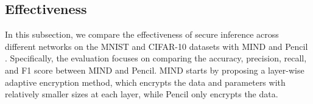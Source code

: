 \documentclass[conference]{IEEEtran}
\begin{document}
\subsection{Effectiveness}
In this subsection, we compare the effectiveness of secure inference across different networks on the MNIST and CIFAR-10 datasets with MIND and Pencil \cite{liu2024pencilprivateextensiblecollaborative}.
Specifically, the evaluation focuses on comparing the accuracy, precision, recall, and F1 score between MIND and Pencil.
MIND starts by proposing a layer-wise adaptive encryption method, which encrypts the data and parameters with relatively smaller sizes at each layer, while Pencil only encrypts the data.














\end{document}
